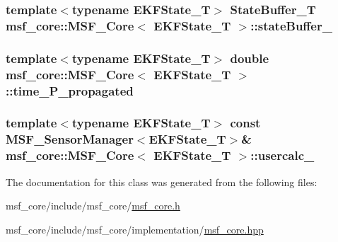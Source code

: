 \hypertarget{classmsf__core_1_1MSF__Core_a1432cacae3165725ebef0094fc5e5389}{
\subsubsection[{state\-Buffer\-\_\-}]{\setlength{\rightskip}{0pt plus 5cm}template$<$typename E\-K\-F\-State\-\_\-\-T$>$ {\bf State\-Buffer\-\_\-\-T} {\bf msf\-\_\-core\-::\-M\-S\-F\-\_\-\-Core}$<$ E\-K\-F\-State\-\_\-\-T $>$\-::state\-Buffer\-\_\-\hspace{0.3cm}{\ttfamily [private]}}}\label{classmsf__core_1_1MSF__Core_a1432cacae3165725ebef0094fc5e5389}
\hypertarget{classmsf__core_1_1MSF__Core_a24258a549bce8e83b9f551261a603139}{
\subsubsection[{time\-\_\-\-P\-\_\-propagated}]{\setlength{\rightskip}{0pt plus 5cm}template$<$typename E\-K\-F\-State\-\_\-\-T$>$ double {\bf msf\-\_\-core\-::\-M\-S\-F\-\_\-\-Core}$<$ E\-K\-F\-State\-\_\-\-T $>$\-::time\-\_\-\-P\-\_\-propagated\hspace{0.3cm}{\ttfamily [private]}}}\label{classmsf__core_1_1MSF__Core_a24258a549bce8e83b9f551261a603139}
\hypertarget{classmsf__core_1_1MSF__Core_a77d5808555e74796738c6053be4ac1a9}{
\subsubsection[{usercalc\-\_\-}]{\setlength{\rightskip}{0pt plus 5cm}template$<$typename E\-K\-F\-State\-\_\-\-T$>$ const {\bf M\-S\-F\-\_\-\-Sensor\-Manager}$<$E\-K\-F\-State\-\_\-\-T$>$\& {\bf msf\-\_\-core\-::\-M\-S\-F\-\_\-\-Core}$<$ E\-K\-F\-State\-\_\-\-T $>$\-::usercalc\-\_\-\hspace{0.3cm}{\ttfamily [private]}}}\label{classmsf__core_1_1MSF__Core_a77d5808555e74796738c6053be4ac1a9}


The documentation for this class was generated from the following files\-:\begin{DoxyCompactItemize}
\item 
msf\-\_\-core/include/msf\-\_\-core/\hyperlink{msf__core_8h}{msf\-\_\-core.\-h}\item 
msf\-\_\-core/include/msf\-\_\-core/implementation/\hyperlink{msf__core_8hpp}{msf\-\_\-core.\-hpp}\end{DoxyCompactItemize}
